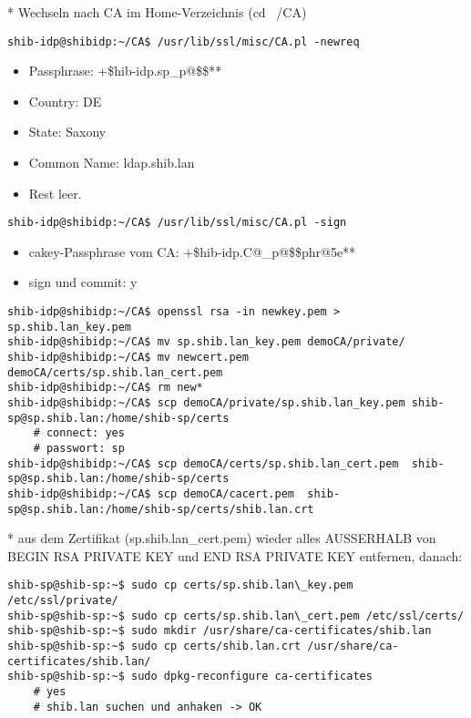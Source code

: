 * Wechseln nach CA im Home-Verzeichnis (cd ~/CA)
\begin{lstlisting}
shib-idp@shibidp:~/CA$ /usr/lib/ssl/misc/CA.pl -newreq
\end{lstlisting}
\begin{itemize}
\item Passphrase: +\$hib-idp.sp\_p@\$\$**
\item Country: DE
\item State: Saxony
\item Common Name: ldap.shib.lan
\item Rest leer.
\end{itemize}
\begin{lstlisting}
shib-idp@shibidp:~/CA$ /usr/lib/ssl/misc/CA.pl -sign
\end{lstlisting}
\begin{itemize}	
\item cakey-Passphrase vom CA: +\$hib-idp.C@\_p@\$\$phr@5e**
\item sign und commit: y
\end{itemize}
\begin{lstlisting}
shib-idp@shibidp:~/CA$ openssl rsa -in newkey.pem > sp.shib.lan_key.pem
shib-idp@shibidp:~/CA$ mv sp.shib.lan_key.pem demoCA/private/
shib-idp@shibidp:~/CA$ mv newcert.pem demoCA/certs/sp.shib.lan_cert.pem
shib-idp@shibidp:~/CA$ rm new*
shib-idp@shibidp:~/CA$ scp demoCA/private/sp.shib.lan_key.pem shib-sp@sp.shib.lan:/home/shib-sp/certs
	# connect: yes
	# passwort: sp
shib-idp@shibidp:~/CA$ scp demoCA/certs/sp.shib.lan_cert.pem  shib-sp@sp.shib.lan:/home/shib-sp/certs
shib-idp@shibidp:~/CA$ scp demoCA/cacert.pem  shib-sp@sp.shib.lan:/home/shib-sp/certs/shib.lan.crt
\end{lstlisting}

* aus dem Zertifikat (sp.shib.lan\_cert.pem) wieder alles AUSSERHALB von BEGIN
RSA PRIVATE KEY und END RSA PRIVATE KEY entfernen, danach:
\begin{lstlisting}
shib-sp@shib-sp:~$ sudo cp certs/sp.shib.lan\_key.pem /etc/ssl/private/
shib-sp@shib-sp:~$ sudo cp certs/sp.shib.lan\_cert.pem /etc/ssl/certs/
shib-sp@shib-sp:~$ sudo mkdir /usr/share/ca-certificates/shib.lan
shib-sp@shib-sp:~$ sudo cp certs/shib.lan.crt /usr/share/ca-certificates/shib.lan/
shib-sp@shib-sp:~$ sudo dpkg-reconfigure ca-certificates 
	# yes
	# shib.lan suchen und anhaken -> OK
\end{lstlisting}


